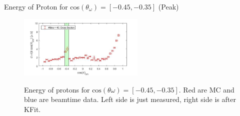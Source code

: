 \documentclass[
		10pt
		]{beamer}
\begin{document}
\begin{frame}{Energy of Proton for cos$(\theta_{\omega})=[-0.45,-0.35]$ (Peak)}

\begin{figure}
	\hspace{0cm}  \vspace{-1cm}
	\includegraphics[width=6cm]{Plots/6}
\end{figure}


\begin{figure}%
	\centering
	\qquad
	\captionsetup{labelformat=empty}
	\caption{Energy of protons for $\textrm{cos}(\theta{\omega}) = [-0.45, -0.35] $. Red are MC and blue are beamtime data. Left side is just measured, right side is after KFit.}%
	\label{fig:example}%
	
\end{figure}

	
\end{frame}
\end{document}
